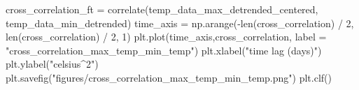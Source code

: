 \documentclass{article}
\begin{document}
\begin{python}
cross_correlation_ft = correlate(temp_data_max_detrended_centered, temp_data_min_detrended)
time_axis = np.arange(-len(cross_correlation) / 2, len(cross_correlation) / 2, 1)
plt.plot(time_axis,cross_correlation, label = "cross_correlation_max_temp_min_temp")
plt.xlabel("time lag (days)")
plt.ylabel("celsius^2")
plt.savefig("figures/cross_correlation_max_temp_min_temp.png")
plt.clf()
	
\end{python}
\end{document}
